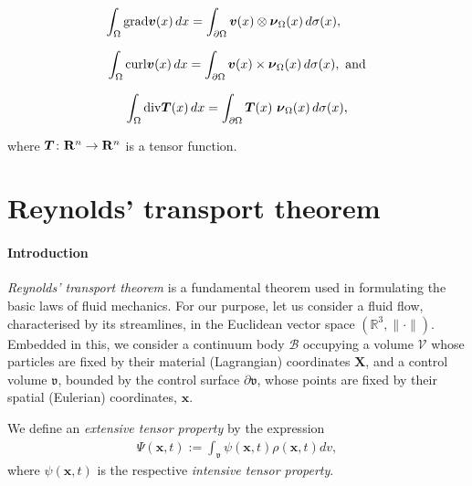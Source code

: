 \begin{equation*}
\int_\Omega \mathrm{grad} \bv(x)\, dx =\int_{\partial \Omega}
\bv(x)\otimes \Bnu_\Omega(x) \, d\sigma(x),\ \phantom{\mathrm{and}}
\end{equation*}

\begin{equation*}
\int_\Omega \mathrm{curl} \mbox{\boldmath$ v$}(x)\, dx =\int_{\partial \Omega}
\mbox{\boldmath$ v$}(x)\times \mbox{\boldmath$\nu$}_\Omega(x) \, d\sigma(x),\ \mathrm{and}
\end{equation*}

\begin{equation*}
\int_\Omega \mathrm{div} \mbox{\boldmath$ T$}(x)\, dx =\int_{\partial \Omega}
\mbox{\boldmath$ T$}(x)\ \mbox{\boldmath$\nu$}_\Omega(x) \, d\sigma(x),
\end{equation*}

\noindent where $\mbox{\boldmath$ T$}\colon\mathbf R^n \to \mathbf R^n$ is a tensor function.

\section{Reynolds' transport theorem}
\label{reynolds-transport}

\paragraph{Introduction}
{\em Reynolds' transport theorem} \citep{Reynolds:1903} is a
fundamental theorem used in formulating the basic laws of fluid
mechanics. For our purpose, let us consider a fluid flow,
characterised by its streamlines, in the Euclidean vector space
$(\mathbb{R}^3,\lVert\cdot\rVert)$.  Embedded in this, we consider a
continuum body $\mathscr{B}$ occupying a volume $\mathscr{V}$ whose
particles are fixed by their material (Lagrangian) coordinates
$\mathbf{X}$, and a control volume $\mathfrak{v}$, bounded by the
control surface $\partial\mathfrak{v}$, whose points are fixed by
their spatial (Eulerian) coordinates, $\mathbf{x}$.

\begin{definition*} We define an {\em extensive tensor property} by
  the expression 
\begin{align}
\Psi(\mathbf{x},t):=
\int_{\mathfrak{v}}\psi(\mathbf{x},t)\rho(\mathbf{x},t)dv,
\label{extensive-property}
\end{align}
where $\psi(\mathbf{x},t)$ is the respective {\em intensive tensor
  property}.
\end{definition*}

